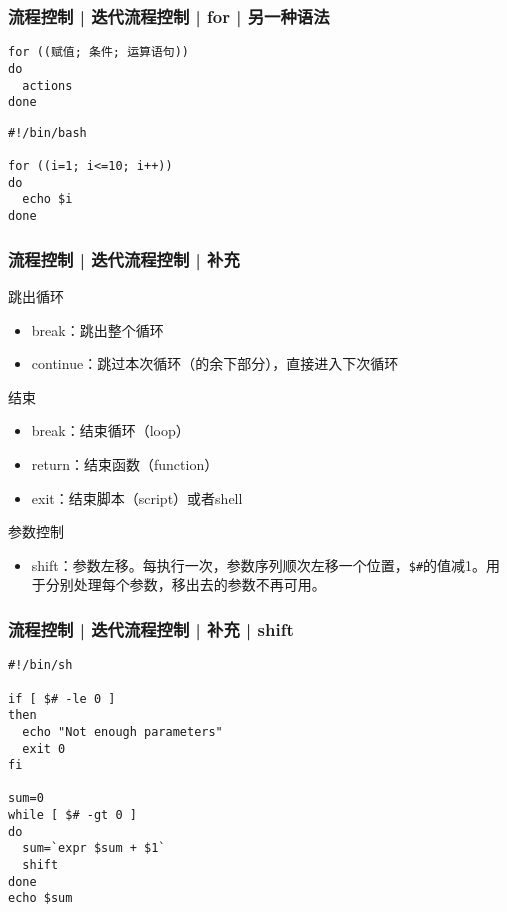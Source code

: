 \begin{frame}[fragile]
  \frametitle{流程控制 | 迭代流程控制 | for | \alert{另一种语法}}
\begin{lstlisting}
for ((赋值; 条件; 运算语句))
do
  actions
done
\end{lstlisting}
\pause
\begin{lstlisting}
#!/bin/bash

for ((i=1; i<=10; i++))
do
  echo $i
done 
\end{lstlisting}
\end{frame}

\begin{frame}[fragile]
  \frametitle{流程控制 | 迭代流程控制 | \alert{补充}}
  \begin{block}{跳出循环}
    \begin{itemize}
      \item break：跳出整个循环
      \item continue：跳过本次循环（的余下部分），直接进入下次循环
    \end{itemize}
  \end{block}
  \pause
  \begin{block}{结束}
    \begin{itemize}
      \item break：结束循环（loop）
      \item return：结束函数（function）
      \item exit：结束脚本（script）或者shell
    \end{itemize}
  \end{block}
  \pause
  \begin{block}{参数控制}
    \begin{itemize}
      \item shift：参数左移。每执行一次，参数序列顺次左移一个位置，\verb|$#|的值减1。用于分别处理每个参数，移出去的参数不再可用。
    \end{itemize}
  \end{block}
\end{frame}

\begin{frame}[fragile]
  \frametitle{流程控制 | 迭代流程控制 | 补充 | shift}
\begin{lstlisting}
#!/bin/sh

if [ $# -le 0 ]
then
  echo "Not enough parameters"
  exit 0
fi

sum=0
while [ $# -gt 0 ]
do
  sum=`expr $sum + $1`
  shift
done
echo $sum
\end{lstlisting}
\end{frame}

